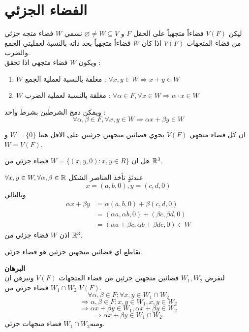 \section[الفضاء الجزئي]{الفضاء الجزئي \cite{key1}}
ليكن $V(F)$ فضاءاً متجهياً على الحقل $F$ و $\varnothing \neq W\subseteq V$ نسمي $W$ فضاء متجه جزئي من فضاء المتجهات $V(F)$ اذا كان $W$ فضاءاً متجهياً بحد ذاته بالنسبة لعمليتي الجمع والضرب.\\
\noindent
ويكون $W$ فضاء متجهي اذا تحقق :
\begin{enumerate}
	\item $W$ مغلقة بالنسبة لعملية الجمع : $\forall x, y \in W \Rightarrow x+y \in W$
	\item $W$ مغلقة بالنسبة لعملية الضرب : $\forall \alpha \in F,\forall x \in W \Rightarrow \alpha\cdot x\in W$
\end{enumerate}
ويمكن دمج الشرطين بشرط واحد :
\[
\forall \alpha, \beta \in F , \forall x, y \in W \Rightarrow \alpha x + \beta y \in W
\]
\begin{note}
	ان كل فضاء متجهي $V(F)$ يحوي فضائين متجهين جزئيين على الاقل هما $W = \{0\}$ و $W = V(F)$.
\end{note}

\begin{example}
	هل ان 
	$W = \{(x, y, 0) : x, y\in R\}$
	فضاء جزئي من $\mathbb{R}^3$.
\end{example}
\begin{solution}
	$\forall x, y \in W, \forall \alpha, \beta\in \mathbb{R}$ عندئذٍ تأخذ العناصر الشكل
	\[
	x = (a, b, 0), y = (c,d,0)
	\]
	وبالتالي
	\begin{align*}
		\alpha x + \beta y &= \alpha(a, b,0) + \beta (c,d,0)\\
		&= (\alpha a, \alpha b, 0) + (\beta c , \beta d, 0)\\
		&= (\alpha a + \beta c, \alpha b + \beta dc, 0) \in W
	\end{align*}
	اذن $W$ فضاء جزئي من $\mathbb{R}^3$.
\end{solution}

\begin{theorem}
	تقاطع اي فضائين متجهين جزئين هو فضاء جزئي.
\end{theorem}
\noindent
\textbf{البرهان}\\
\noindent
لنفرض $W_1, W_2 $ فضائين متجهين جزئين من فضاء المتجهات $V(F)$ ونبرهن ان $W_1\cap W_2$ فضاء جزئي من $V(F)$.
\[
\forall \alpha, \beta\in F; \forall x,y\in W_1\cap W_2
\]
\[
\Rightarrow\alpha,\beta\in F; x, y \in W_1, x, y\in W_2
\]
\[
\Rightarrow\alpha x + \beta y \in W_1, \alpha x + \beta y \in W_2
\]
\[
\Rightarrow\alpha x + \beta y \in W_1\cap W_2. 
\]
ومنه$W_1\cap W_2$ فضاء متجهات جزئي.

